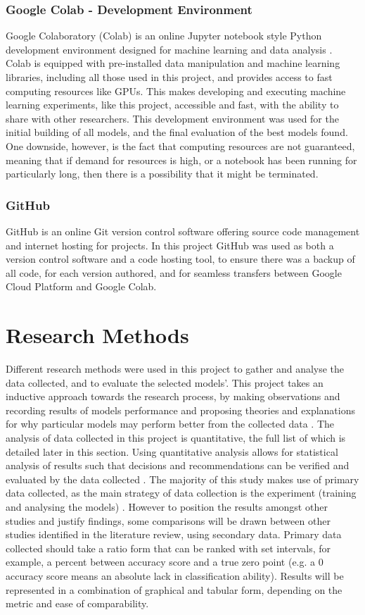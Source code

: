 \subsubsection{Google Colab - Development Environment}
Google Colaboratory (Colab) is an online Jupyter notebook style Python development environment designed for machine learning and data analysis \citep{GoogleCo52:online}. Colab is equipped with pre-installed data manipulation and machine learning libraries, including all those used in this project, and provides access to fast computing resources like GPUs. This makes developing and executing machine learning experiments, like this project, accessible and fast, with the ability to share with other researchers. This development environment was used for the initial building of all models, and the final evaluation of the best models found. One downside, however, is the fact that computing resources are not guaranteed, meaning that if demand for resources is high, or a notebook has been running for particularly long, then there is a possibility that it might be terminated.

\subsubsection{GitHub}
GitHub is an online Git version control software offering source code management and internet hosting for projects. In this project GitHub was used as both a version control software and a code hosting tool, to ensure there was a backup of all code, for each version authored, and for seamless transfers between Google Cloud Platform and Google Colab.

\section{Research Methods}
Different research methods were used in this project to gather and analyse the data collected, and to evaluate the selected models'. This project takes an inductive approach towards the research process, by making observations and recording results of models performance and proposing theories and explanations for why particular models may perform better from the collected data \citep{saunders2009research}. The analysis of data collected in this project is quantitative, the full list of which is detailed later in this section. Using quantitative analysis allows for statistical analysis of results such that decisions and recommendations can be verified and evaluated by the data collected \citep{saunders2009research}. The majority of this study makes use of primary data collected, as the main strategy of data collection is the experiment (training and analysing the models) \citep{hox2005data}. However to position the results amongst other studies and justify findings, some comparisons will be drawn between other studies identified in the literature review, using secondary data. Primary data collected should take a ratio form that can be ranked with set intervals, for example, a percent between accuracy score and a true zero point (e.g. a 0 accuracy score means an absolute lack in classification ability). Results will be represented in a combination of graphical and tabular form, depending on the metric and ease of comparability. 

